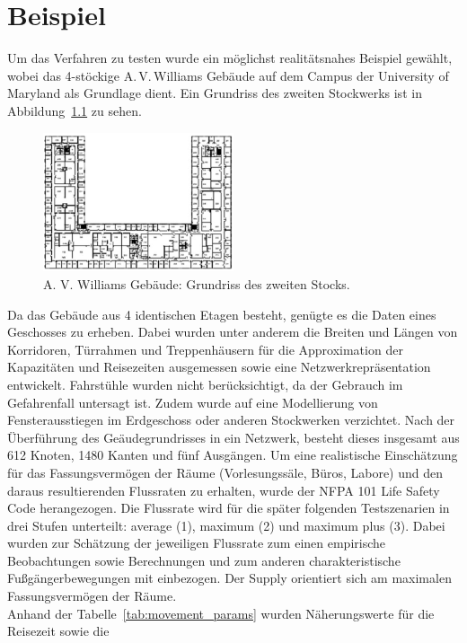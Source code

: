 \documentclass[a4paper, 11pt]{scrreprt}
\begin{document}
\chapter{Beispiel}
Um das Verfahren zu testen wurde ein möglichst realitätsnahes Beispiel gewählt, wobei das
4-stöckige A.\,V.\,Williams Gebäude auf dem Campus der University of Maryland als Grundlage dient.
Ein Grundriss des zweiten Stockwerks ist in Abbildung~\ref{fig:grundriss} zu sehen.
\begin{figure}[htb!]
    \centering
    \includegraphics[width=0.5\textwidth]{images/grundriss.png}
    \caption{A. V. Williams Gebäude: Grundriss des zweiten Stocks.}
    \label{fig:grundriss}
\end{figure}
Da das Gebäude aus 4 identischen Etagen besteht, genügte es die Daten eines Geschosses zu erheben.
Dabei wurden unter anderem die Breiten und Längen von Korridoren, Türrahmen und Treppenhäusern
für die Approximation der Kapazitäten und Reisezeiten
ausgemessen sowie eine Netzwerkrepräsentation entwickelt. Fahrstühle wurden nicht berücksichtigt, da
der Gebrauch im Gefahrenfall untersagt ist. Zudem wurde auf eine Modellierung von Fensterausstiegen im
Erdgeschoss oder anderen Stockwerken verzichtet.
Nach der Überführung des Geäudegrundrisses in ein Netzwerk, besteht dieses insgesamt aus 612 Knoten,
1480 Kanten und fünf Ausgängen. Um eine realistische Einschätzung für das Fassungsvermögen der
Räume (Vorlesungssäle, Büros, Labore) und den daraus resultierenden Flussraten zu erhalten,
wurde der NFPA 101 Life Safety Code \cite{fassungsvermoegen} herangezogen.
Die Flussrate wird für die später folgenden Testszenarien in drei Stufen unterteilt:
average (1), maximum (2) und maximum plus (3). Dabei wurden zur Schätzung der jeweiligen
Flussrate zum einen empirische Beobachtungen sowie Berechnungen \cite{pedestrian} und zum anderen charakteristische
Fußgängerbewegungen \cite{movement_params} mit einbezogen. Der Supply orientiert sich am maximalen
Fassungsvermögen der Räume.\\
Anhand der Tabelle~\ref{tab:movement_params} wurden Näherungswerte für die Reisezeit sowie die
\end{document}
